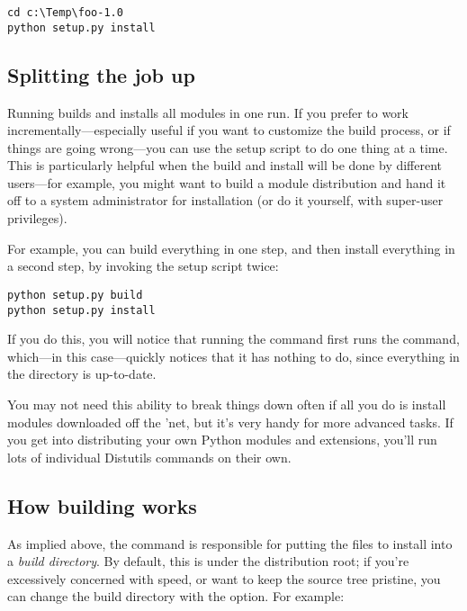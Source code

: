\documentclass{howto}
\begin{document}
\begin{verbatim}
cd c:\Temp\foo-1.0
python setup.py install
\end{verbatim}

\subsection{Splitting the job up}
\label{splitting-up}

Running  builds and installs all modules in one
run.  If you prefer to work incrementally---especially useful if you
want to customize the build process, or if things are going wrong---you
can use the setup script to do one thing at a time.  This is
particularly helpful when the build and install will be done by
different users---for example, you might want to build a module distribution
and hand it off to a system administrator for installation (or do it
yourself, with super-user privileges).

For example, you can build everything in one step, and then install
everything in a second step, by invoking the setup script twice:

\begin{verbatim}
python setup.py build
python setup.py install
\end{verbatim}

If you do this, you will notice that running the 
command first runs the  command, which---in this
case---quickly notices that it has nothing to do, since everything in
the  directory is up-to-date.

You may not need this ability to break things down often if all you do
is install modules downloaded off the 'net, but it's very handy for more
advanced tasks.  If you get into distributing your own Python modules
and extensions, you'll run lots of individual Distutils commands on
their own.


\subsection{How building works}
\label{how-build-works}

As implied above, the  command is responsible for putting
the files to install into a \emph{build directory}.  By default, this is
 under the distribution root; if you're excessively
concerned with speed, or want to keep the source tree pristine, you can
change the build directory with the  option.
For example:
\end{document}
